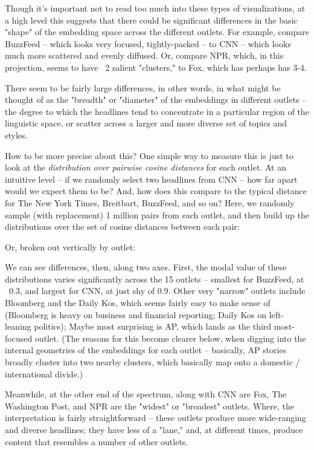 \documentclass{scrartcl}
\begin{document}

Though it's important not to read too much into these types of visualizations, at a high level this suggests that there could be significant differences in the basic "shape" of the embedding space across the different outlets. For example, compare BuzzFeed -- which looks very focused, tightly-packed -- to CNN -- which looks much more scattered and evenly diffused. Or, compare NPR, which, in this projection, seems to have ~2 salient "clusters," to Fox, which has perhaps has 3-4.

There seem to be fairly large differences, in other words, in what might be thought of as the "breadth" or "diameter" of the embeddings in different outlets -- the degree to which the headlines tend to concentrate in a particular region of the linguistic space, or scatter across a larger and more diverse set of topics and styles.

How to be more precise about this? One simple way to measure this is just to look at the \textit{distribution over pairwise cosine distances} for each outlet. At an intuitive level -- if we randomly select two headlines from CNN -- how far apart would we expect them to be? And, how does this compare to the typical distance for The New York Times, Breitbart, BuzzFeed, and so on? Here, we randomly sample (with replacement) 1 million pairs from each outlet, and then build up the distributions over the set of cosine distances between each pair:


Or, broken out vertically by outlet:


We can see differences, then, along two axes. First, the modal value of these distributions varies significantly across the 15 outlets -- smallest for BuzzFeed, at ~0.3, and largest for CNN, at just shy of 0.9. Other very "narrow" outlets include Bloomberg and the Daily Kos, which seems fairly easy to make sense of (Bloomberg is heavy on business and financial reporting; Daily Kos on left-leaning politics); Maybe most surprising is AP, which lands as the third most-focused outlet. (The reasons for this become clearer below, when digging into the internal geometries of the embeddings for each outlet -- basically, AP stories broadly cluster into two nearby clusters, which basically map onto a domestic / international divide.)

Meanwhile, at the other end of the spectrum, along with CNN are Fox, The Washington Post, and NPR are the "widest" or "broadest" outlets. Where, the interpretation is fairly straightforward -- these outlets produce more wide-ranging and diverse headlines; they have less of a "lane," and, at different times, produce content that resembles a number of other outlets.
\end{document}
